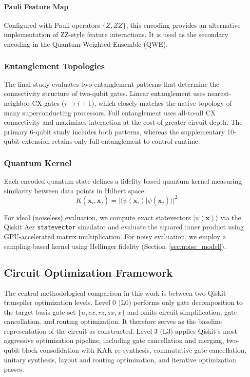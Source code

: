 \documentclass{ieeeaccess}
\begin{document}
\paragraph{Pauli Feature Map} Configured with Pauli operators $\{Z, ZZ\}$, this encoding provides an alternative implementation of ZZ-style feature interactions. It is used as the secondary encoding in the Quantum Weighted Ensemble (QWE).

\subsubsection{Entanglement Topologies}
The final study evaluates two entanglement patterns that determine the connectivity structure of two-qubit gates. Linear entanglement uses nearest-neighbor $\text{CX}$ gates ($i \to i{+}1$), which closely matches the native topology of many superconducting processors. Full entanglement uses all-to-all $\text{CX}$ connectivity and maximizes interaction at the cost of greater circuit depth. The primary 6-qubit study includes both patterns, whereas the supplementary 10-qubit extension retains only full entanglement to control runtime.

\subsubsection{Quantum Kernel}
Each encoded quantum state defines a fidelity-based quantum kernel measuring similarity between data points in Hilbert space:
\begin{equation}
K(\mathbf{x}_i, \mathbf{x}_j) = \bigl|\langle \psi(\mathbf{x}_i) | \psi(\mathbf{x}_j) \rangle\bigr|^2
\label{eq:kernel}
\end{equation}

For ideal (noiseless) evaluation, we compute exact statevectors $|\psi(\mathbf{x})\rangle$ via the Qiskit Aer \texttt{statevector} simulator and evaluate the squared inner product using GPU-accelerated matrix multiplication. For noisy evaluation, we employ a sampling-based kernel using Hellinger fidelity (Section~\ref{sec:noise_model}).

\subsection{Circuit Optimization Framework}
\label{sec:optimization}

The central methodological comparison in this work is between two Qiskit transpiler optimization levels. Level 0 (L0) performs only gate decomposition to the target basis gate set $\{u, cx, rz, sx, x\}$ and omits circuit simplification, gate cancellation, and routing optimization. It therefore serves as the baseline representation of the circuit as constructed. Level 3 (L3) applies Qiskit's most aggressive optimization pipeline, including gate cancellation and merging, two-qubit block consolidation with KAK re-synthesis, commutative gate cancellation, unitary synthesis, layout and routing optimization, and iterative optimization passes.
\end{document}
